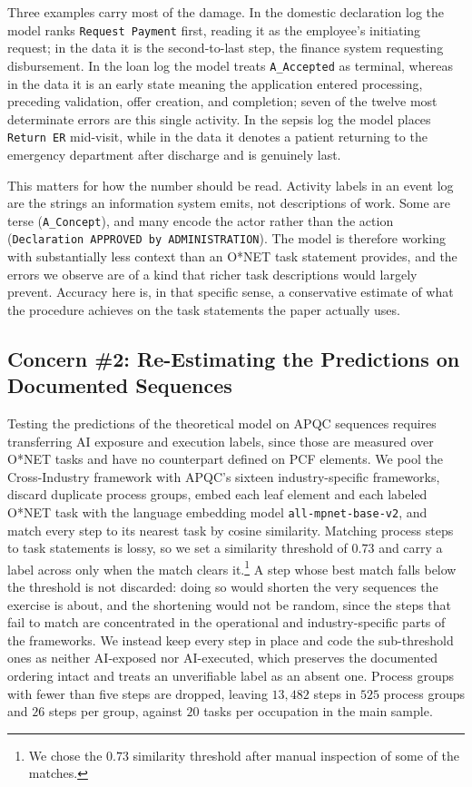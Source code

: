 Three examples carry most of the damage.
In the domestic declaration log the model ranks \texttt{Request Payment} first, reading it as the employee's initiating request; in the data it is the second-to-last step, the finance system requesting disbursement.
In the loan log the model treats \texttt{A\_Accepted} as terminal, whereas in the data it is an early state meaning the application entered processing, preceding validation, offer creation, and completion; seven of the twelve most determinate errors are this single activity.
In the sepsis log the model places \texttt{Return ER} mid-visit, while in the data it denotes a patient returning to the emergency department after discharge and is genuinely last.

This matters for how the number should be read.
Activity labels in an event log are the strings an information system emits, not descriptions of work.
Some are terse (\texttt{A\_Concept}), and many encode the actor rather than the action (\texttt{Declaration APPROVED by ADMINISTRATION}).
The model is therefore working with substantially less context than an O*NET task statement provides, and the errors we observe are of a kind that richer task descriptions would largely prevent.
Accuracy here is, in that specific sense, a conservative estimate of what the procedure achieves on the task statements the paper actually uses.


\subsection{Concern \#2: Re-Estimating the Predictions on Documented Sequences}
\label{app:apqc_fragmentation_top}

Testing the predictions of the theoretical model on APQC sequences requires transferring AI exposure and execution labels, since those are measured over O*NET tasks and have no counterpart defined on PCF elements.
We pool the Cross-Industry framework with APQC's sixteen industry-specific frameworks, discard duplicate
process groups, embed each leaf element and each labeled O*NET task with the language embedding model \texttt{all-mpnet-base-v2}, and match every step to its nearest task by cosine similarity.
Matching process steps to task statements is lossy, so we set a similarity threshold of $0.73$ and carry a
label across only when the match clears it.\footnote{We chose the $0.73$ similarity threshold after manual inspection of some of the matches.}
A step whose best match falls below the threshold is not discarded: doing so would shorten the very sequences
the exercise is about, and the shortening would not be random, since the steps that fail to match are
concentrated in the operational and industry-specific parts of the frameworks.
We instead keep every step in place and code the sub-threshold ones as neither AI-exposed nor AI-executed,
which preserves the documented ordering intact and treats an unverifiable label as an absent one.
Process groups with fewer than five steps are dropped, leaving $13{,}482$ steps in $525$ process groups and
$26$ steps per group, against $20$ tasks per occupation in the main sample.

